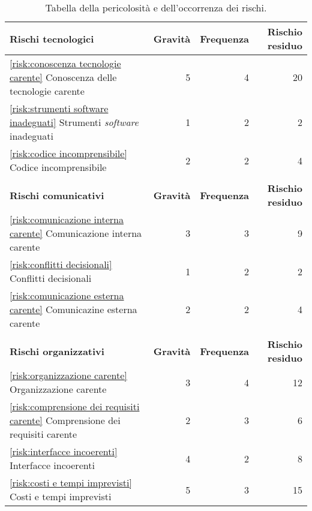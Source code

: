 \begin{table}[H]
	\centering

	\begin{tabular}{l|r|r|r}
		\hline
		\textbf{Rischi tecnologici}                                                          & \textbf{Gravità} & \textbf{Frequenza} & \textbf{Rischio residuo} \\
		\hline
		\autoref{risk:conoscenza tecnologie carente} Conoscenza delle tecnologie carente     & 5                & 4                  & 20                       \\
		\autoref{risk:strumenti software inadeguati} Strumenti \textit{software} inadeguati           & 1                & 2                  & 2                        \\
		\autoref{risk:codice incomprensibile} Codice incomprensibile                         & 2                & 2                  & 4                        \\
		\hline
		\multicolumn{4}{l}{}                                                                                                                                    \\
		\hline
		\textbf{Rischi comunicativi}                                                         & \textbf{Gravità} & \textbf{Frequenza} & \textbf{Rischio residuo} \\
		\hline
		\autoref{risk:comunicazione interna carente} Comunicazione interna carente           & 3                & 3                  & 9                        \\
		\autoref{risk:conflitti decisionali} Conflitti decisionali                           & 1                & 2                  & 2                        \\
		\autoref{risk:comunicazione esterna carente} Comunicazine esterna carente            & 2                & 2                  & 4                        \\
		\hline
		\multicolumn{4}{l}{}                                                                                                                                    \\
		\hline
		\textbf{Rischi organizzativi}                                                        & \textbf{Gravità} & \textbf{Frequenza} & \textbf{Rischio residuo} \\
		\hline
		\autoref{risk:organizzazione carente} Organizzazione carente                         & 3                & 4                  & 12                       \\
		\autoref{risk:comprensione dei requisiti carente} Comprensione dei requisiti carente & 2                & 3                  & 6                        \\
		\autoref{risk:interfacce incoerenti} Interfacce incoerenti                           & 4                & 2                  & 8                        \\
		\autoref{risk:costi e tempi imprevisti} Costi e tempi imprevisti                     & 5                & 3                  & 15                       \\
		\hline
	\end{tabular}
	\caption{Tabella della pericolosità e dell'occorrenza dei rischi.}
\end{table}
